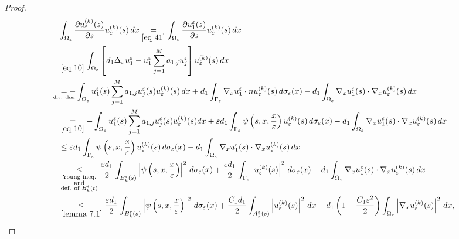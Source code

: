 \begin{proof}
\begin{equation}
  \begin{aligned}
        &\int_{\Omega_{\epsilon}} \frac{\partial u_{\epsilon}^{(k)}(s)}{\partial s} u_{\epsilon}^{(k)}(s) \, dx \underset{\eqref{eq 41}}{=}\int_{\Omega_{\epsilon}} \frac{\partial u_{1}^{\epsilon}(s)}{\partial s} u_{\epsilon}^{(k)}(s) \, dx \\
        &\underset{\eqref{eq 10}}{=}\int_{\Omega_{\epsilon}}\left[d_{1} \Delta_{x} u_{1}^{\epsilon}-u_{1}^{\epsilon} \sum_{j=1}^{M} a_{1, j} u_{j}^{\epsilon}\right] u_{\epsilon}^{(k)}(s) \, dx \\
        &\underset{\mathclap{\text{\tiny div. thm}}}{=}-\int_{\Omega_{\epsilon}} u_{1}^{\epsilon}(s) \sum_{j=1}^{M} a_{1, j} u_{j}^{\epsilon}(s) u_{\epsilon}^{(k)}(s) \, dx+d_{1} \int_{\Gamma_{\epsilon}} \nabla_{x} u^{\epsilon}_1 \cdot n u_{\epsilon}^{(k)}(s) \, {d} \sigma_{\epsilon}(x)-d_{1} \int_{\Omega_{\epsilon}} \nabla_{x} u_{1}^{\epsilon}(s) \cdot \nabla_{x} u_{\epsilon}^{(k)}(s) \, dx \\
        &\underset{\eqref{eq 10}}{=}-\int_{\Omega_{\epsilon}} u_{1}^{\epsilon}(s) \sum_{j=1}^{M} a_{1, j} u_{j}^{\epsilon}(s) u_{\epsilon}^{(k)}(s) {d} x+\epsilon d_{1} \int_{\Gamma_{\epsilon}} \psi\left(s, x, \frac{x}{\epsilon}\right) u_{\epsilon}^{(k)}(s) \, {d}\sigma_{\epsilon}(x)
        -d_{1} \int_{\Omega_{\epsilon}} \nabla_{x} u_{1}^{\epsilon}(s) \cdot \nabla_{x} u_{\epsilon}^{(k)}(s) \, {d} x \\
        &\leq \epsilon d_{1} \int_{\Gamma_{\epsilon}} \psi\left(s, x, \frac{x}{\epsilon}\right) u_{\epsilon}^{(k)}(s) \, {d} \sigma_{\epsilon}(x)-d_{1} \int_{\Omega_{\epsilon}} \nabla_{x} u_{1}^{\epsilon}(s) \cdot \nabla_{x} u_{\epsilon}^{(k)}(s) \, {d} x \\
        &\underset{\substack{\text{Young ineq.}\\\text{and}\\\text{def. of } B_{k}^{\epsilon}(t)}}{\leq} \frac{\epsilon d_{1}}{2} \int_{B_{k}^{\epsilon}(s)}\left|\psi\left(s, x, \frac{x}{\epsilon}\right)\right|^{2} \, {d} \sigma_{\epsilon}(x)+\frac{\epsilon d_{1}}{2} \int_{\Gamma_{\epsilon}}\left|u_{\epsilon}^{(k)}(s)\right|^{2} \, {d} \sigma_{\epsilon}(x) -d_{1} \int_{\Omega_{\epsilon}} \nabla_{x} u_{1}^{\epsilon}(s) \cdot \nabla_{x} u_{\epsilon}^{(k)}(s) \, {d} x \\
        &\underset{\eqref{lemma 7.1}}{\leq} \frac{\epsilon d_{1}}{2} \int_{B_{k}^{\epsilon}(s)}\left|\psi\left(s, x, \frac{x}{\epsilon}\right)\right|^{2} \, {d} \sigma_{\epsilon}(x)+\frac{C_{1} d_{1}}{2} \int_{A_{k}^{\epsilon}(s)}\left|u_{\epsilon}^{(k)}(s)\right|^{2} \, {d} x -d_{1}\left(1-\frac{C_{1} \epsilon^{2}}{2}\right) \int_{\Omega_{\epsilon}}\left|\nabla_{x} u_{\epsilon}^{(k)}(s)\right|^{2} \, {d} x,

\end{aligned}
\end{equation}
\end{proof}
